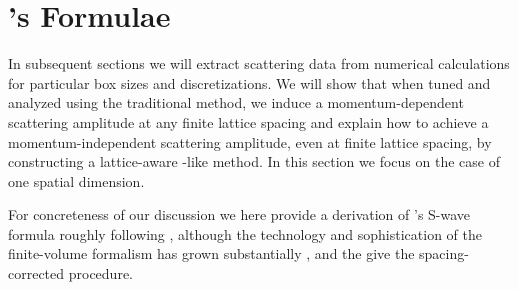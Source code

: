 \section{\Luscher's Formulae}\label{sec:one-dimension}

In subsequent sections we will extract scattering data from numerical calculations for particular box sizes and discretizations.
We will show that when tuned and analyzed using the traditional \Luscher method, we induce a momentum-dependent scattering amplitude at any finite lattice spacing and explain how to achieve a momentum-independent scattering amplitude, even at finite lattice spacing, by constructing a lattice-aware \Luscher-like method.
In this section we focus on the case of one spatial dimension.

For concreteness of our discussion we here provide a derivation of \Luscher's S-wave formula roughly following , although the technology and sophistication of the finite-volume formalism has grown substantially \cite{Zhu:2019dho}, and the give the spacing-corrected procedure.



